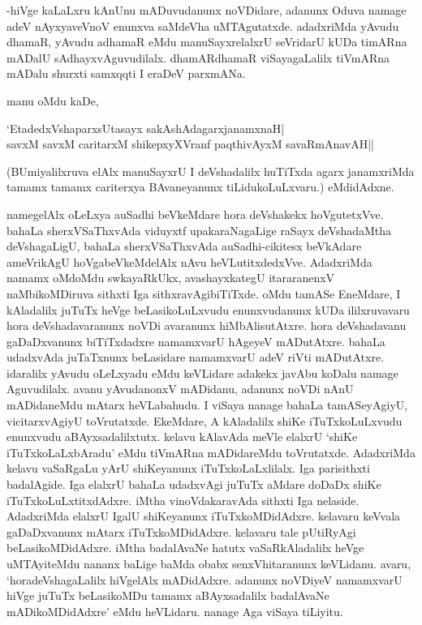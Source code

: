 -hiVge kaLaLxru kAnUnu mADuvudanunx noVDidare, adanunx Oduva namage adeV nAyxyaveVnoV enunxva saMdeVha uMTAgutatxde. adadxriMda yAvudu dhamaR, yAvudu adhamaR eMdu manuSayxrelalxrU seVridarU kUDa timARna mADalU sAdhayxvAguvudilalx. dhamARdhamaR viSayagaLalilx tiVmARna mADalu shurxti samxqqti I eraDeV parxmANa. 

manu oMdu kaDe,

\begin{shloka}
`EtadedxVshaparxsUtasayx sakAshAdagarxjanamxnaH|\\
savxM savxM caritarxM shikepxyXVranf paqthivAyxM savaRmAnavAH||
\end{shloka}

(BUmiyalilxruva elAlx manuSayxrU I deVshadalilx huTiTxda agarx janamxriMda tamamx tamamx cariterxya BAvaneyanunx tiLidukoLuLxvaru.) eMdidAdxne.

namegelAlx oLeLxya auSadhi beVkeMdare hora deVshakekx hoVgutetxVve. bahaLa sherxVSaThxvAda viduyxtf upakaraNagaLige raSayx deVshadaMtha deVshagaLigU, bahaLa sherxVSaThxvAda auSadhi-cikitesx beVkAdare ameVrikAgU hoVgabeVkeMdelAlx nAvu heVLutitxdedxVve. AdadxriMda namamx oMdoMdu swkayaRkUkx, avashayxkategU itararanenxV naMbikoMDiruva sithxti Iga sithxravAgibiTiTxde. oMdu tamASe EneMdare, I kAladalilx juTuTx heVge beLasikoLuLxvudu enunxvudanunx kUDa ililxruvavaru hora deVshadavaranunx noVDi avaranunx hiMbAlisutAtxre. hora deVshadavanu gaDaDxvanunx biTiTxdadxre namamxvarU hAgeyeV mADutAtxre. bahaLa udadxvAda juTaTxnunx beLasidare namamxvarU adeV riVti mADutAtxre. idaralilx yAvudu oLeLxyadu eMdu keVLidare adakekx javAbu koDalu namage Aguvudilalx. avanu yAvudanonxV mADidanu, adanunx noVDi nAnU mADidaneMdu mAtarx heVLabahudu. I viSaya nanage bahaLa tamASeyAgiyU, vicitarxvAgiyU toVrutatxde. EkeMdare, A kAladalilx shiKe iTuTxkoLuLxvudu enunxvudu aBAyxsadalilxtutx. kelavu kAlavAda meVle elalxrU `shiKe iTuTxkoLaLxbAradu' eMdu tiVmARna mADidareMdu toVrutatxde. AdadxriMda kelavu vaSaRgaLu yArU shiKeyanunx iTuTxkoLaLxlilalx. Iga parisithxti badalAgide. Iga elalxrU bahaLa udadxvAgi juTuTx aMdare doDaDx shiKe iTuTxkoLuLxtitxdAdxre. iMtha vinoVdakaravAda sithxti Iga nelaside. AdadxriMda elalxrU IgalU shiKeyanunx iTuTxkoMDidAdxre. kelavaru keVvala gaDaDxvanunx mAtarx iTuTxkoMDidAdxre. kelavaru tale pUtiRyAgi beLasikoMDidAdxre. iMtha badalAvaNe hatutx vaSaRkAladalilx heVge uMTAyiteMdu nananx baLige baMda obabx senxVhitaranunx keVLidanu. avaru, `horadeVshagaLalilx hiVgelAlx mADidAdxre. adanunx noVDiyeV namamxvarU hiVge juTuTx beLasikoMDu tamamx aBAyxsadalilx badalAvaNe mADikoMDidAdxre' eMdu heVLidaru. nanage Aga viSaya tiLiyitu. 

